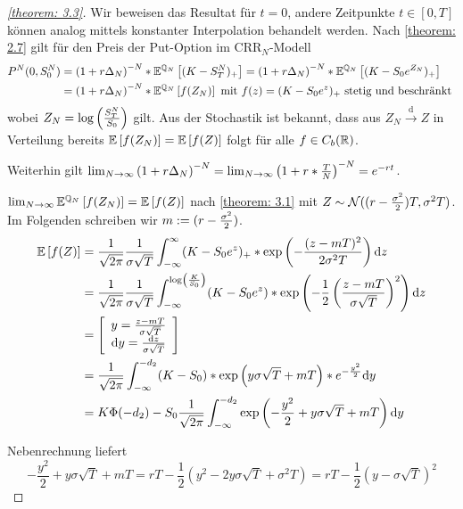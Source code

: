 \begin{proof}[\cref{theorem: 3.3}]	
	Wir beweisen das Resultat für $t = 0$, andere Zeitpunkte $t \in [0,T]$ können analog mittels konstanter Interpolation behandelt werden. Nach \cref{theorem: 2.7} gilt für den Preis der Put-Option im CRR${}_N$-Modell 
	\begin{align*}
		P^N(0,S_0^N) &= \left( 1 + r \Delta_N \right)^{-N} * \mathbb{E}^{\mathbb{Q}_N}\left[ (K- S_T^N)_+ \right] 
		= \left( 1 + r \Delta_N \right)^{-N} *  \mathbb{E}^{\mathbb{Q}_N}\left[ (K- S_0 e^	{Z_N})_+ \right] \\
		&= \left( 1 + r \Delta_N \right)^{-N} * \mathbb{E}^{\mathbb{Q}_N}\left[ f(Z_N) \right] \text{ mit } f(z) = (K - S_0 e^z)_+ \text{ stetig und beschränkt }
	\end{align*}
	wobei $Z_N = \log\left( \frac{S_T^N}{S_0} \right)$ gilt. Aus der Stochastik ist bekannt, dass aus $Z_N \overset{\mathrm{d}}{\to} Z$ in Verteilung bereits $\mathbb{E} \left[ f(Z_N) \right] = \mathbb{E} \left[ f(Z) \right]$ folgt für alle $f \in C_b(\mathbb{R})$.
	
	Weiterhin gilt $\lim_{N \to \infty} \left( 1 + r \Delta_N \right)^{-N} = \lim_{N \to \infty} \left( 1 + r * \frac{T}{N} \right)^{-N} = e^{-r t}$.
	
	$\lim_{N \to \infty} \mathbb{E}^{\mathbb{Q}_N}\left[ f(Z_N) \right] = \mathbb{E} \left[ f(Z) \right]$ nach \cref{theorem: 3.1} mit $Z \sim \mathcal{N}((r-\frac{\sigma^2}{2})T , \sigma^2 T)$. Im Folgenden schreiben wir $m \mathrel{:=} (r-\frac{\sigma^2}{2})$. 
	\begin{align*}
		\mathbb{E} \left[ f(Z) \right] &= \frac{1}{\sqrt{2 \pi}} \frac{1}{\sigma \sqrt{T}}  \int_{-\infty}^\infty (K - S_0 e^z)_+ * \exp \left( - \frac{(z - mT)^2}{2 \sigma^2 T} \right) \mathrm{d}{z} \\
		&= \frac{1}{\sqrt{2 \pi}}  \frac{1}{\sigma \sqrt{T}} \int_{-\infty}^{\log\left( \frac{K}{S_0} \right)} (K - S_0 e^z) * \exp \left( - \frac{1}{2} \left( \frac{z - mT}{ \sigma \sqrt{T}} \right)^2 \right) \mathrm{d}{z} \\
		&= \left[  \begin{array}{c}
			y = \frac{z - m T}{\sigma \sqrt{T}} \\
			\mathrm{d} y = \frac{\mathrm{d} z}{\sigma \sqrt{T}}
			\end{array}  \right] \\
		&= \frac{1}{\sqrt{2 \pi}}  \int_{-\infty}^{-d_2} (K - S_0)  * \exp \left( y \sigma \sqrt{T} + mT \right) * e^{-\frac{y^2}{2}} \mathrm{d}{y} \\
		&= K \Phi(-d_2) - S_0 \frac{1}{\sqrt{2\pi}} \int_{-\infty}^{-d_2} \exp \left( - \frac{y^2}{2} + y \sigma \sqrt{T} + mT \right) \mathrm{d}{y} 
	\end{align*}
	
	Nebenrechnung liefert
	\begin{equation*}
		-\frac{y^2}{2} + y \sigma \sqrt{T} + mT = rT - \frac{1}{2} (y^2 - 2y \sigma \sqrt{T} + \sigma^2 T) = rT - \frac{1}{2} (y - \sigma\sqrt{T})^2
	\end{equation*}
	

\end{proof}
